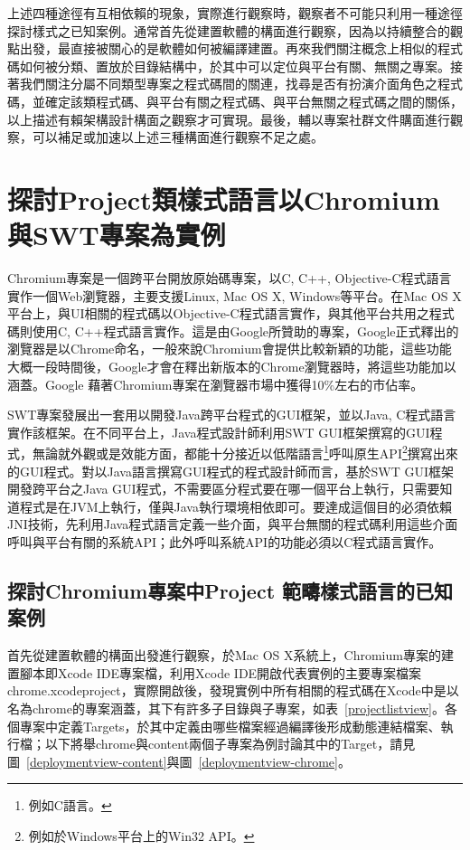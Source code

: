 上述四種途徑有互相依賴的現象，實際進行觀察時，觀察者不可能只利用一種途徑探討樣式之已知案例。通常首先從建置軟體的構面進行觀察，因為以持續整合的觀點出發，最直接被關心的是軟體如何被編譯建置。再來我們關注概念上相似的程式碼如何被分類、置放於目錄結構中，於其中可以定位與平台有關、無關之專案。接著我們關注分屬不同類型專案之程式碼間的關連，找尋是否有扮演介面角色之程式碼，並確定該類程式碼、與平台有關之程式碼、與平台無關之程式碼之間的關係，以上描述有賴架構設計構面之觀察才可實現。最後，輔以專案社群文件購面進行觀察，可以補足或加速以上述三種構面進行觀察不足之處。


\section{探討Project類樣式語言以\textendash\hspace{4pt}Chromium與SWT專案為實例}
Chromium專案是一個跨平台開放原始碼專案，以C, C++, Objective-C程式語言實作一個Web瀏覽器，主要支援Linux, Mac OS X, Windows等平台。在Mac OS X平台上，與UI相關的程式碼以Objective-C程式語言實作，與其他平台共用之程式碼則使用C, C++程式語言實作。這是由Google所贊助的專案，Google正式釋出的瀏覽器是以Chrome命名，一般來說Chromium會提供比較新穎的功能，這些功能大概一段時間後，Google才會在釋出新版本的Chrome瀏覽器時，將這些功能加以涵蓋。Google 藉著Chromium專案在瀏覽器市場中獲得10\%左右的市佔率\cite{browsermarketshare}。

SWT專案發展出一套用以開發Java跨平台程式的GUI框架，並以Java, C程式語言實作該框架。在不同平台上，Java程式設計師利用SWT GUI框架撰寫的GUI程式，無論就外觀或是效能方面，都能十分接近以低階語言\footnote{例如C語言。}呼叫原生API\footnote{例如於Windows平台上的Win32 API。}撰寫出來的GUI程式。對以Java語言撰寫GUI程式的程式設計師而言，基於SWT GUI框架開發跨平台之Java GUI程式，不需要區分程式要在哪一個平台上執行，只需要知道程式是在JVM\cite{jvm}上執行，僅與Java執行環境相依即可。要達成這個目的必須依賴JNI技術\cite{jni}，先利用Java程式語言定義一些介面，與平台無關的程式碼利用這些介面呼叫與平台有關的系統API；此外呼叫系統API的功能必須以C程式語言實作。

\subsection{探討Chromium專案中Project 範疇樣式語言的已知案例}

首先從建置軟體的構面出發進行觀察，於Mac OS X系統上，Chro\-mium\-專案的建置腳本即Xcode IDE專案檔，利用Xcode IDE\cite{xcode}開啟代表實例的主要專案檔案chrome.\-xcode\-project，實際開啟後，發現實例中所有相關的程式碼在Xcode中是以名為chrome的專案涵蓋，其下有許多子目錄與子專案，如表~\ref{projectlistview}。各個專案中定義Targets，於其中定義由哪些檔案經過編譯後形成動態連結檔案、執行檔；以下將舉chrome與content兩個子專案為例討論其中的Target，請見圖~\ref{deploymentview-content}與圖~\ref{deploymentview-chrome}。

